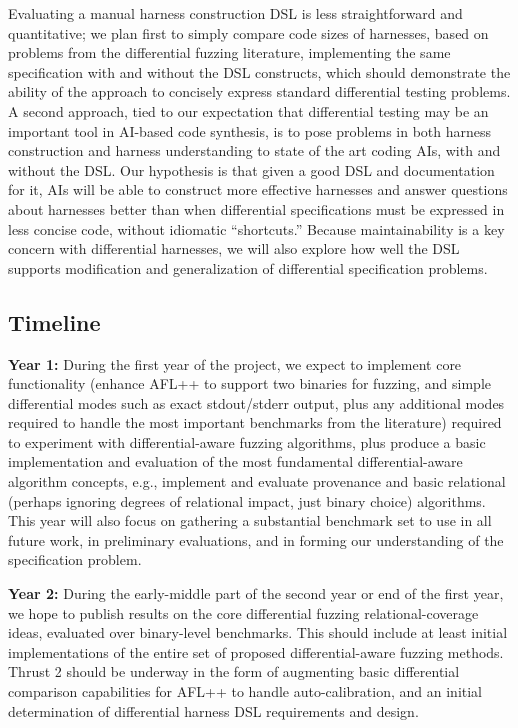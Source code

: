 Evaluating a manual harness construction DSL is less straightforward
and quantitative; we plan first to simply compare code sizes of
harnesses, based on problems from the differential fuzzing literature,
implementing the same specification with and without the DSL
constructs, which should demonstrate the ability of the approach to
concisely express standard differential testing problems.  A second
approach, tied to our expectation that differential testing may be an
important tool in AI-based code synthesis, is to pose problems in both
harness construction and harness understanding to state of the art
coding AIs, with and without the DSL.  Our hypothesis is that given a
good DSL and documentation for it, AIs will be able to construct more
effective harnesses and answer questions about harnesses better than
when differential specifications must be expressed in less concise
code, without idiomatic ``shortcuts.''  Because maintainability is a
key concern with differential harnesses, we will also explore how well
the DSL supports modification and generalization of differential
specification problems.

\subsection{Timeline}

{\bf Year 1:} During the first year of the project, we expect to implement core
functionality (enhance AFL++ to support two binaries for fuzzing, and
simple differential modes such as exact stdout/stderr output, plus any
additional modes required to handle the most important benchmarks from
the literature) required to experiment with differential-aware fuzzing
algorithms, plus produce a basic implementation and evaluation of the
most fundamental differential-aware algorithm concepts, e.g.,
implement and evaluate provenance and basic relational (perhaps
ignoring degrees of relational impact, just binary choice)
algorithms.  This year will also focus on gathering a substantial
benchmark set to use in all future work, in preliminary evaluations,
and in forming our understanding of the specification problem.

{\bf Year 2:} During the early-middle part of the second year or end of the
first year, we hope to publish results on the core differential
fuzzing relational-coverage ideas, evaluated over binary-level
benchmarks.  This should include at least initial implementations of
the entire set of proposed differential-aware fuzzing methods.  Thrust
2 should be underway in the form of augmenting basic differential
comparison capabilities for AFL++ to handle auto-calibration, and an
initial determination of differential harness DSL requirements and
design.

